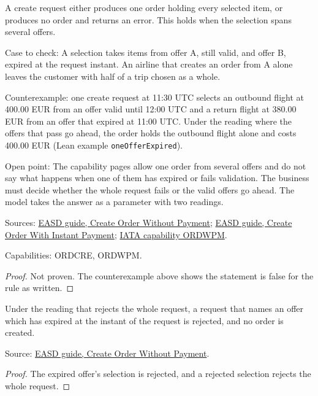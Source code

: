 \begin{theorem}
  \label{thm:order-creation-create-atomic}
  A create request either produces one order holding every selected item, or
  produces no order and returns an error. This holds when the selection
  spans several offers.

  Case to check: A selection takes items from offer A, still valid, and
  offer B, expired at the request instant. An airline that creates an order
  from A alone leaves the customer with half of a trip chosen as a whole.

  Counterexample: one create request at 11:30 UTC selects an outbound flight
  at 400.00 EUR from an offer valid until 12:00 UTC and a return flight at
  380.00 EUR from an offer that expired at 11:00 UTC.  Under the reading where
  the offers that pass go ahead, the order holds the outbound flight alone
  and costs 400.00 EUR (Lean example \texttt{oneOfferExpired}).

  Open point: The capability pages allow one order from several offers and
  do not say what happens when one of them has expired or fails validation.
  The business must decide whether the whole request fails or the valid
  offers go ahead.  The model takes the answer as a parameter with two
  readings.

  Sources: \href{https://standards.atlassian.net/wiki/spaces/EASD/pages/574455879/Create+Order+Without+Payment}{EASD guide, Create Order Without Payment};
  \href{https://standards.atlassian.net/wiki/spaces/EASD/pages/574619727/Create+Order+With+Instant+Payment}{EASD guide, Create Order With Instant Payment};
  \href{https://retailing.iata.org/armi/docs/ORDWPM/}{IATA capability ORDWPM}.

  Capabilities: ORDCRE, ORDWPM.
\end{theorem}
\begin{proof}
  Not proven.  The counterexample above shows the statement is false for the
  rule as written.
\end{proof}

\begin{theorem}
  \label{thm:order-creation-create-atomic-of-whole}
  Under the reading that rejects the whole request, a request that names an
  offer which has expired at the instant of the request is rejected, and no
  order is created.

  Source: \href{https://standards.atlassian.net/wiki/spaces/EASD/pages/574455879/Create+Order+Without+Payment}{EASD guide, Create Order Without Payment}.
\end{theorem}
\begin{proof}
  The expired offer's selection is rejected, and a rejected selection rejects
  the whole request.
\end{proof}


